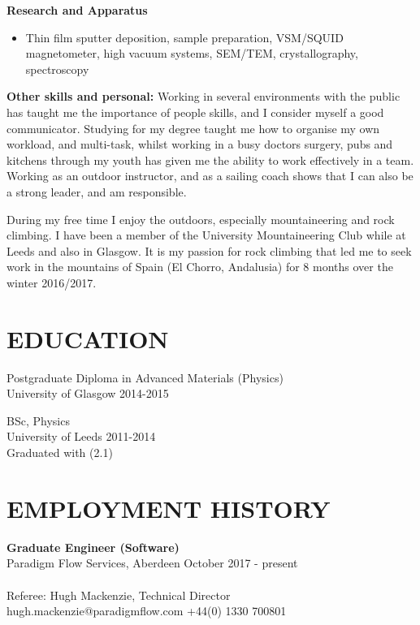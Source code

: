 \documentclass[margin, line, 10pt]{res} %
\begin{document}
\begin{resume}
\textbf{Research and Apparatus} 
\begin{itemize}
\item Thin film sputter deposition, sample preparation, VSM/SQUID magnetometer, high vacuum systems, SEM/TEM, crystallography, spectroscopy
\end{itemize}

\textbf{Other skills and personal:}
Working in several environments with the public has taught me the importance of  people skills, and I consider myself a good communicator. Studying for my degree taught me how to organise my own workload, and multi-task, whilst working in a busy doctors surgery, pubs and kitchens through my youth has given me the ability to work effectively in a team. Working as an outdoor instructor, and as a sailing coach shows that I can also be a strong leader, and am responsible.\

During my free time I enjoy the outdoors, especially mountaineering and rock climbing. I have been a member of the University Mountaineering Club while at Leeds and also in Glasgow. It is my passion for rock climbing that led me to seek work in the mountains of Spain (El Chorro, Andalusia) for 8 months over the winter 2016/2017.

\section{EDUCATION}

Postgraduate Diploma in Advanced Materials (Physics)\\
University of Glasgow 2014-2015 \

BSc, Physics \\
University of Leeds 2011-2014 \\
Graduated with (2.1) 

\section{EMPLOYMENT HISTORY}

\textbf{Graduate Engineer (Software)} \\
Paradigm Flow Services, Aberdeen \hfill October 2017 - present\\\\
Referee: Hugh Mackenzie, Technical Director \\
hugh.mackenzie@paradigmflow.com +44(0) 1330 700801\\

\begin{itemize}


\end{itemize}
\end{resume}
\end{document}
